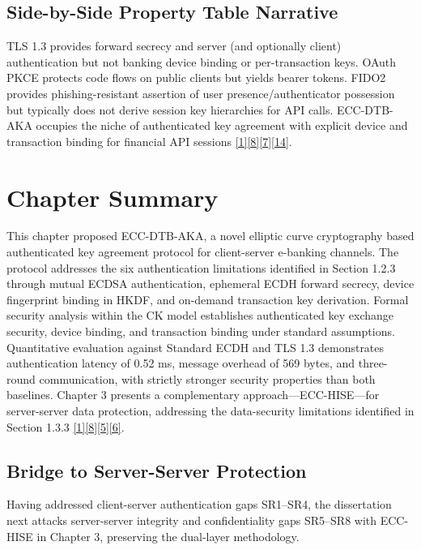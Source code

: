 \subsection{Side-by-Side Property Table Narrative}

\indent TLS 1.3 provides forward secrecy and server (and optionally client) authentication but not banking device binding or per-transaction keys. OAuth PKCE protects code flows on public clients but yields bearer tokens. FIDO2 provides phishing-resistant assertion of user presence/authenticator possession but typically does not derive session key hierarchies for API calls. ECC-DTB-AKA occupies the niche of authenticated key agreement with explicit device and transaction binding for financial API sessions \hyperref[ref:1]{[1]}\hyperref[ref:8]{[8]}\hyperref[ref:7]{[7]}\hyperref[ref:14]{[14]}.

\section{Chapter Summary}

\indent This chapter proposed ECC-DTB-AKA, a novel elliptic curve cryptography based authenticated key agreement protocol for client-server e-banking channels. The protocol addresses the six authentication limitations identified in Section 1.2.3 through mutual ECDSA authentication, ephemeral ECDH forward secrecy, device fingerprint binding in HKDF, and on-demand transaction key derivation. Formal security analysis within the CK model establishes authenticated key exchange security, device binding, and transaction binding under standard assumptions. Quantitative evaluation against Standard ECDH and TLS 1.3 demonstrates authentication latency of 0.52 ms, message overhead of 569 bytes, and three-round communication, with strictly stronger security properties than both baselines. Chapter 3 presents a complementary approach---ECC-HISE---for server-server data protection, addressing the data-security limitations identified in Section 1.3.3 \hyperref[ref:1]{[1]}\hyperref[ref:8]{[8]}\hyperref[ref:5]{[5]}\hyperref[ref:6]{[6]}.

\subsection{Bridge to Server-Server Protection}

\indent Having addressed client-server authentication gaps SR1--SR4, the dissertation next attacks server-server integrity and confidentiality gaps SR5--SR8 with ECC-HISE in Chapter 3, preserving the dual-layer methodology.

